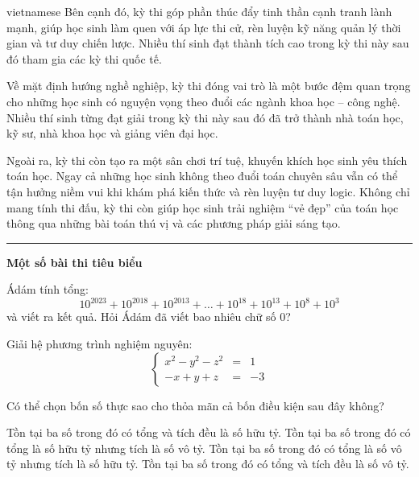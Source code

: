 \documentclass{article}
\begin{document}
\begin{otherlanguage*}{vietnamese}
Bên cạnh đó, kỳ thi góp phần thúc đẩy tinh thần cạnh tranh lành mạnh, giúp học sinh làm quen với áp lực thi cử, rèn luyện kỹ năng quản lý thời gian và tư duy chiến lược.
Nhiều thí sinh đạt thành tích cao trong kỳ thi này sau đó tham gia các kỳ thi quốc tế.

Về mặt định hướng nghề nghiệp, kỳ thi đóng vai trò là một bước đệm quan trọng cho những học sinh có nguyện vọng theo đuổi các ngành khoa học – công nghệ.
Nhiều thí sinh từng đạt giải trong kỳ thi này sau đó đã trở thành nhà toán học, kỹ sư, nhà khoa học và giảng viên đại học.

Ngoài ra, kỳ thi còn tạo ra một sân chơi trí tuệ, khuyến khích học sinh yêu thích toán học.
Ngay cả những học sinh không theo đuổi toán chuyên sâu vẫn có thể tận hưởng niềm vui khi khám phá kiến thức và rèn luyện tư duy logic.
Không chỉ mang tính thi đấu, kỳ thi còn giúp học sinh trải nghiệm “vẻ đẹp” của toán học thông qua những bài toán thú vị và các phương pháp giải sáng tạo.

\bigbreak

\noindent\rule{16.5cm}{0.4pt}

\textbf{Một số bài thi tiêu biểu}

\bigbreak

\begin{problem*}
    Ádám tính tổng:  
    \[
        10^{2023} + 10^{2018} + 10^{2013} + \dots + 10^{18} + 10^{13} + 10^8 + 10^3
    \]
    và viết ra kết quả. Hỏi Ádám đã viết bao nhiêu chữ số \( 0 \)?
\end{problem*}

\begin{problem*}
    Giải hệ phương trình nghiệm nguyên:
    \[
        \left\{
            \begin{array}{rcl}
                x^2 - y^2 - z^2 &=& 1\\
                -x+y+z &=& -3
            \end{array}
        \right.
    \]
\end{problem*}

\begin{problem*}
    Có thể chọn bốn số thực sao cho thỏa mãn cả bốn điều kiện sau đây không?  
    \begin{enumerate}[topsep=0pt, partopsep=0pt, itemsep=0pt]
        \ii Tồn tại ba số trong đó có tổng và tích đều là số hữu tỷ.  
        \ii Tồn tại ba số trong đó có tổng là số hữu tỷ nhưng tích là số vô tỷ.  
        \ii Tồn tại ba số trong đó có tổng là số vô tỷ nhưng tích là số hữu tỷ.
        \ii Tồn tại ba số trong đó có tổng và tích đều là số vô tỷ.
    \end{enumerate}
\end{problem*}


\end{otherlanguage*}
\end{document}
